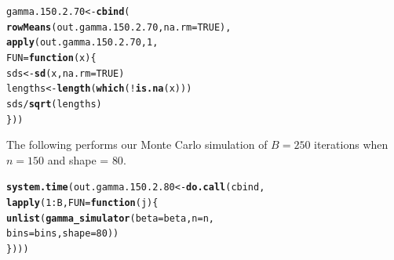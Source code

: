\documentclass[11pt]{article}\usepackage[]{graphicx}\usepackage[]{color}
\makeatletter
\newcommand{\hlnum}[1]{\textcolor[rgb]{0.686,0.059,0.569}{#1}}%
\newcommand{\hlopt}[1]{\textcolor[rgb]{0,0,0}{#1}}%
\newcommand{\hlstd}[1]{\textcolor[rgb]{0.345,0.345,0.345}{#1}}%
\newcommand{\hlkwa}[1]{\textcolor[rgb]{0.161,0.373,0.58}{\textbf{#1}}}%
\newcommand{\hlkwb}[1]{\textcolor[rgb]{0.69,0.353,0.396}{#1}}%
\newcommand{\hlkwc}[1]{\textcolor[rgb]{0.333,0.667,0.333}{#1}}%
\newcommand{\hlkwd}[1]{\textcolor[rgb]{0.737,0.353,0.396}{\textbf{#1}}}%
\newenvironment{kframe}{%
 \def\at@end@of@kframe{}%
 \ifinner\ifhmode%
  \def\at@end@of@kframe{\end{minipage}}%
  \begin{minipage}{\columnwidth}%
 \fi\fi%
 \def\FrameCommand##1{\hskip\@totalleftmargin \hskip-\fboxsep
 \colorbox{shadecolor}{##1}\hskip-\fboxsep
     \hskip-\linewidth \hskip-\@totalleftmargin \hskip\columnwidth}%
 \MakeFramed {\advance\hsize-\width
   \@totalleftmargin\z@ \linewidth\hsize
   \@setminipage}}%
 {\par\unskip\endMakeFramed%
 \at@end@of@kframe}
\newenvironment{knitrout}{}{} %
\makeatother
\begin{document}
\begin{knitrout}
\color{fgcolor}\begin{kframe}
\begin{alltt}
\hlstd{gamma.150.2.70} \hlkwb{<-} \hlkwd{cbind}\hlstd{(}
  \hlkwd{rowMeans}\hlstd{(out.gamma.150.2.70,} \hlkwc{na.rm} \hlstd{=} \hlnum{TRUE}\hlstd{),}
  \hlkwd{apply}\hlstd{(out.gamma.150.2.70,} \hlnum{1}\hlstd{,}
  \hlkwc{FUN} \hlstd{=} \hlkwa{function}\hlstd{(}\hlkwc{x}\hlstd{)\{}
    \hlstd{sds} \hlkwb{<-} \hlkwd{sd}\hlstd{(x,} \hlkwc{na.rm} \hlstd{=} \hlnum{TRUE}\hlstd{)}
    \hlstd{lengths} \hlkwb{<-} \hlkwd{length}\hlstd{(}\hlkwd{which}\hlstd{(}\hlopt{!}\hlkwd{is.na}\hlstd{(x)))}
    \hlstd{sds} \hlopt{/} \hlkwd{sqrt}\hlstd{(lengths)}
  \hlstd{\}))}
\end{alltt}


{\ttfamily\noindent\bfseries\color{errorcolor}{\#\# Error in is.data.frame(x): object 'out.gamma.150.2.70' not found}}\end{kframe}
\end{knitrout}

The following performs our Monte Carlo simulation of $B = 250$ iterations 
when $n = 150$ and shape = $80$.

\begin{knitrout}
\color{fgcolor}\begin{kframe}
\begin{alltt}
\hlkwd{system.time}\hlstd{(out.gamma.150.2.80} \hlkwb{<-} \hlkwd{do.call}\hlstd{(cbind,}
  \hlkwd{lapply}\hlstd{(}\hlnum{1}\hlopt{:}\hlstd{B,} \hlkwc{FUN} \hlstd{=} \hlkwa{function}\hlstd{(}\hlkwc{j}\hlstd{)\{}
    \hlkwd{unlist}\hlstd{(}\hlkwd{gamma_simulator}\hlstd{(}\hlkwc{beta} \hlstd{= beta,} \hlkwc{n} \hlstd{= n,}
      \hlkwc{bins} \hlstd{= bins,} \hlkwc{shape} \hlstd{=} \hlnum{80}\hlstd{))}
\hlstd{\})))}
\end{alltt}


{\ttfamily\noindent\bfseries\color{errorcolor}{\#\# Error in eval(predvars, data, env): object 'x1' not found}}

{\ttfamily\noindent\itshape\color{messagecolor}{\#\# Timing stopped at: 0.002 0 0.002}}\end{kframe}
\end{knitrout}
\end{document}
